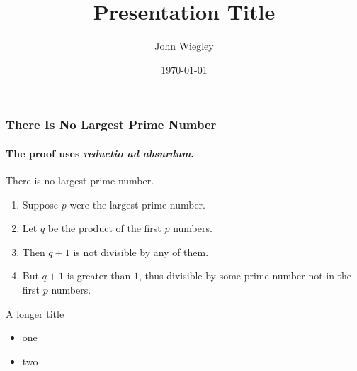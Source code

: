\documentclass{beamer}
\title{Presentation Title}
\date{\today}
\author[Euclid]{John Wiegley}
\begin{document}
\begin{frame}
\titlepage
\end{frame}

\begin{frame}
\frametitle{There Is No Largest Prime Number}
\framesubtitle{The proof uses \textit{reductio ad absurdum}.}
\begin{theorem}
There is no largest prime number. \end{theorem}
\begin{enumerate}
\item<1-| alert@1> Suppose $p$ were the largest prime number.
\item<2-> Let $q$ be the product of the first $p$ numbers.
\item<3-> Then $q+1$ is not divisible by any of them.
\item<1-> But $q + 1$ is greater than $1$, thus divisible by some prime
number not in the first $p$ numbers.
\end{enumerate}
\end{frame}

\begin{frame}[t]{A longer title}
\begin{itemize}
\item one
\item two
\end{itemize}
\end{frame}
\end{document}
